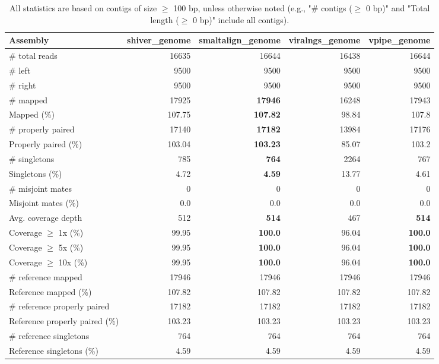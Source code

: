 \documentclass[12pt,a4paper]{article}
\begin{document}
\begin{table}[ht]
\begin{center}
\caption{All statistics are based on contigs of size $\geq$ 100 bp, unless otherwise noted (e.g., "\# contigs ($\geq$ 0 bp)" and "Total length ($\geq$ 0 bp)" include all contigs).}
\begin{tabular}{|l*{4}{|r}|}
\hline
Assembly & shiver\_genome & smaltalign\_genome & viralngs\_genome & vpipe\_genome \\ \hline
\# total reads & 16635 & 16644 & 16438 & 16644 \\ \hline
\# left & 9500 & 9500 & 9500 & 9500 \\ \hline
\# right & 9500 & 9500 & 9500 & 9500 \\ \hline
\# mapped & 17925 & {\bf 17946} & 16248 & 17943 \\ \hline
Mapped (\%) & 107.75 & {\bf 107.82} & 98.84 & 107.8 \\ \hline
\# properly paired & 17140 & {\bf 17182} & 13984 & 17176 \\ \hline
Properly paired (\%) & 103.04 & {\bf 103.23} & 85.07 & 103.2 \\ \hline
\# singletons & 785 & {\bf 764} & 2264 & 767 \\ \hline
Singletons (\%) & 4.72 & {\bf 4.59} & 13.77 & 4.61 \\ \hline
\# misjoint mates & 0 & 0 & 0 & 0 \\ \hline
Misjoint mates (\%) & 0.0 & 0.0 & 0.0 & 0.0 \\ \hline
Avg. coverage depth & 512 & {\bf 514} & 467 & {\bf 514} \\ \hline
Coverage $\geq$ 1x (\%) & 99.95 & {\bf 100.0} & 96.04 & {\bf 100.0} \\ \hline
Coverage $\geq$ 5x (\%) & 99.95 & {\bf 100.0} & 96.04 & {\bf 100.0} \\ \hline
Coverage $\geq$ 10x (\%) & 99.95 & {\bf 100.0} & 96.04 & {\bf 100.0} \\ \hline
\# reference mapped & 17946 & 17946 & 17946 & 17946 \\ \hline
Reference mapped (\%) & 107.82 & 107.82 & 107.82 & 107.82 \\ \hline
\# reference properly paired & 17182 & 17182 & 17182 & 17182 \\ \hline
Reference properly paired (\%) & 103.23 & 103.23 & 103.23 & 103.23 \\ \hline
\# reference singletons & 764 & 764 & 764 & 764 \\ \hline
Reference singletons (\%) & 4.59 & 4.59 & 4.59 & 4.59 \\ \hline

\end{tabular}
\end{center}
\end{table}
\end{document}
